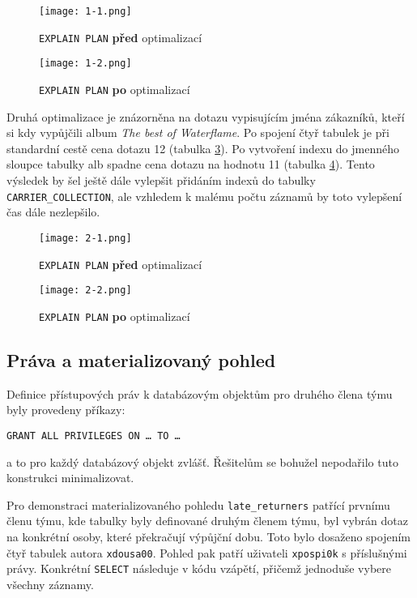 \begin{figure}[h]
    \centering
    \texttt{[image: 1-1.png]}
    \caption{\texttt{EXPLAIN PLAN} \textbf{před} optimalizací}
    \label{pic1}
\end{figure}

\begin{figure}[h]
    \centering
    \texttt{[image: 1-2.png]}
    \caption{\texttt{EXPLAIN PLAN} \textbf{po} optimalizací}
    \label{pic2}
\end{figure}


\newpage
Druhá optimalizace je znázorněna na dotazu vypisujícím jména zákazníků, kteří si kdy vypůjčili album \textit{The best of Waterflame}. Po spojení čtyř tabulek je při standardní cestě  cena dotazu 12 (tabulka \ref{pic3}). Po vytvoření indexu do jmenného sloupce tabulky alb spadne cena dotazu na hodnotu 11 (tabulka \ref{pic4}). Tento výsledek by šel ještě dále vylepšit přidáním indexů do tabulky \texttt{CARRIER\_COLLECTION}, ale vzhledem k malému počtu záznamů by toto vylepšení čas dále nezlepšilo.



\begin{figure}[h]
    \centering
    \texttt{[image: 2-1.png]}
    \caption{\texttt{EXPLAIN PLAN} \textbf{před} optimalizací}
    \label{pic3}
\end{figure}


\begin{figure}[h]
    \centering
    \texttt{[image: 2-2.png]}
    \caption{\texttt{EXPLAIN PLAN} \textbf{po} optimalizací}
    \label{pic4}
\end{figure}



\newpage
\subsection{Práva a materializovaný pohled}
Definice přístupových práv k databázovým objektům pro druhého člena týmu byly provedeny příkazy:

\medskip
\noindent
\texttt{GRANT~ALL~PRIVILEGES~ON~\dots~TO~\dots}

\medskip
\noindent
a to pro každý databázový objekt zvlášť. Řešitelům se bohužel nepodařilo tuto konstrukci minimalizovat. 

Pro demonstraci materializovaného pohledu \texttt{late\_returners} patřící prvnímu členu týmu, kde tabulky byly definované druhým členem týmu, byl vybrán dotaz na konkrétní osoby, které překračují výpůjční dobu. Toto bylo dosaženo spojením čtyř tabulek autora \texttt{xdousa00}. Pohled pak patří uživateli \texttt{xpospi0k} s příslušnými právy. Konkrétní \texttt{SELECT} následuje v kódu vzápětí,  přičemž jednoduše vybere všechny záznamy.

